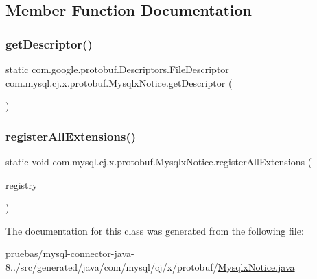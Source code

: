 \subsection{Member Function Documentation}
\mbox{\label{classcom_1_1mysql_1_1cj_1_1x_1_1protobuf_1_1_mysqlx_notice_aa99a45f1df9e903f4a4a3c7d9a7ff493}} 
\subsubsection{\texorpdfstring{get\+Descriptor()}{getDescriptor()}}
{\footnotesize\ttfamily static com.\+google.\+protobuf.\+Descriptors.\+File\+Descriptor com.\+mysql.\+cj.\+x.\+protobuf.\+Mysqlx\+Notice.\+get\+Descriptor (\begin{DoxyParamCaption}{ }\end{DoxyParamCaption})\hspace{0.3cm}{\ttfamily [static]}}

\mbox{\label{classcom_1_1mysql_1_1cj_1_1x_1_1protobuf_1_1_mysqlx_notice_ad57d550156408f5afd6f3aaa12d8c0c5}} 
\subsubsection{\texorpdfstring{register\+All\+Extensions()}{registerAllExtensions()}}
{\footnotesize\ttfamily static void com.\+mysql.\+cj.\+x.\+protobuf.\+Mysqlx\+Notice.\+register\+All\+Extensions (\begin{DoxyParamCaption}\item[{com.\+google.\+protobuf.\+Extension\+Registry}]{registry }\end{DoxyParamCaption})\hspace{0.3cm}{\ttfamily [static]}}



The documentation for this class was generated from the following file\+:\begin{DoxyCompactItemize}
\item 
pruebas/mysql-\/connector-\/java-\/8../src/generated/java/com/mysql/cj/x/protobuf/\mbox{\hyperlink{_mysqlx_notice_8java}{Mysqlx\+Notice.\+java}}\end{DoxyCompactItemize}
